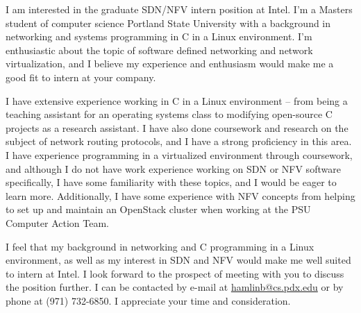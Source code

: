 \documentclass[10pt,stdletter,dateno,sigleft]{newlfm} %
\begin{document}
\begin{newlfm}


I am interested in the graduate SDN/NFV intern position at Intel. I'm a Masters
student of computer science Portland State University with a background in
networking and systems programming in C in a Linux environment. I'm enthusiastic
about the topic of software defined networking and network virtualization, and I
believe my experience and enthusiasm would make me a good fit to intern at your
company.

I have extensive experience working in C in a Linux environment -- from being a
teaching assistant for an operating systems class to modifying open-source C
projects as a research assistant. I have also done coursework and research on
the subject of network routing protocols, and I have a strong proficiency in
this area. I have experience programming in a virtualized environment through
coursework, and although I do not have work experience working on SDN or NFV
software specifically, I have some familiarity with these topics, and I would be
eager to learn more. Additionally, I have some experience with NFV concepts from
helping to set up and maintain an OpenStack cluster when working at the PSU
Computer Action Team.

I feel that my background in networking and C programming in a Linux
environment, as well as my interest in SDN and NFV  would make me well suited to
intern at Intel. I look forward to the prospect of meeting with you to discuss
the position further. I can be contacted by e-mail at
\href{mailto:hamlinb@cs.pdx.edu}{hamlinb@cs.pdx.edu} or by phone at
(971) 732-6850. I appreciate your time and consideration.


\end{newlfm}
\end{document}
